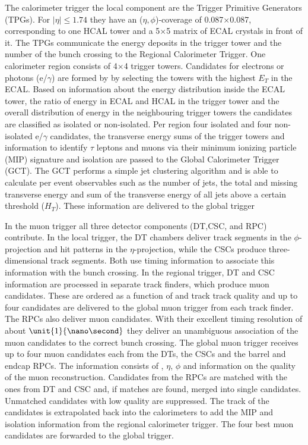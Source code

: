 The calorimeter trigger the local component are the Trigger Primitive Generators (TPGs). For $\vert \eta \vert \leq 1.74$ they have an ($\eta,\phi$)-coverage of 0.087$\times$0.087, corresponding to one HCAL tower and a 5$\times$5 matrix of ECAL crystals in front of it. The TPGs communicate the energy deposits in the trigger tower and the number of the bunch crossing to the Regional Calorimeter Trigger. One calorimeter region consists of 4$\times$4 trigger towers. Candidates for electrons or photons (e/$\gamma$) are formed by by selecting the towers with the highest $E_T$ in the ECAL. Based on information about the energy distribution inside the ECAL tower, the ratio of energy in ECAL and HCAL in the trigger tower and the overall distribution of energy in the neighbouring trigger towers the candidates are classified as isolated or non-isolated. Per region four isolated and four non-isolated e/$\gamma$ candidates, the transverse energy sums of the trigger towers and information to identify $\tau$ leptons and muons via their minimum ionizing particle (MIP) signature and isolation are passed to the Global Calorimeter Trigger (GCT). The GCT performs a simple jet clustering algorithm and is able to calculate per event observables such as the number of jets, the total and missing transverse energy and sum of the transverse energy of all jets above a certain threshold ($H_T$). These information are delivered to the global trigger

In the muon trigger all three detector components (DT,CSC, and RPC) contribute. In the local trigger, the DT chambers deliver track segments in the $\phi$-projection and hit patterns in the $\eta$-projection, while the CSCs produce three-dimensional track segments. Both use timing information to associate this information with the bunch crossing. In the regional trigger, DT and CSC information are processed in separate track finders, which produce muon candidates. These are ordered as a function of \pt and track track quality and up to four candidates are delivered to the global muon trigger from each track finder. The RPCs also deliver muon candidates. With their excellent timing resolution of about $\unit{1}{\nano\second}$ they deliver an unambiguous association of the muon candidates to the correct bunch crossing. The global muon trigger receives up to four muon candidates each from the DTs, the CSCs and the barrel and endcap RPCs. The information consists of \pt, $\eta$, $\phi$ and information on the quality of the muon reconstruction. Candidates from the RPCs are matched with the ones from DT and CSC and, if matches are found, merged into single candidates. Unmatched candidates with low quality are suppressed. The track of the candidates is extrapolated back into the calorimeters to add the MIP and isolation information from the regional calorimeter trigger. The four best muon candidates are forwarded to the global trigger. 

